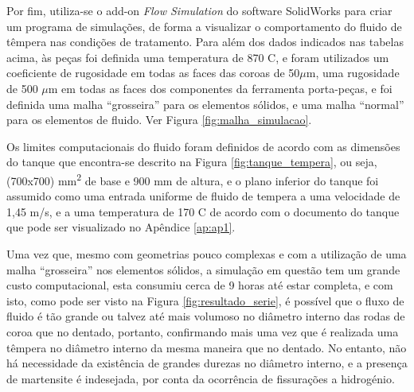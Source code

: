 \par
Por fim, utiliza-se o add-on \textit{Flow Simulation} do software SolidWorks para criar um programa de simulações, de forma a visualizar o comportamento do fluido de têmpera nas condições de tratamento. Para além dos dados indicados nas tabelas acima, às peças foi definida uma temperatura de 870 \textdegree C, e foram utilizados um coeficiente de rugosidade em todas as faces das coroas de 50$\mu$m, uma rugosidade de 500 $\mu$m em todas as faces dos componentes da ferramenta porta-peças, e foi definida uma malha “grosseira” para os elementos sólidos, e uma malha “normal” para os elementos de fluido. Ver Figura \ref{fig:malha_simulacao}.
\par
Os limites computacionais do fluido foram definidos de acordo com as dimensões do tanque que encontra-se descrito na Figura \ref{fig:tanque_tempera}, ou seja, (700x700) mm\textsuperscript{2} de base e 900 mm de altura, e o plano inferior do tanque foi assumido como uma entrada uniforme de fluido de tempera a uma velocidade de 1,45 m/s, e a uma temperatura de 170 \textdegree C de acordo com o documento do tanque que pode ser visualizado no Apêndice \ref{ap:ap1}.
\newpage
\par
Uma vez que, mesmo com geometrias pouco complexas e com a utilização de uma malha “grosseira” nos elementos sólidos, a simulação em questão tem um grande custo computacional, esta consumiu cerca de 9 horas até estar completa, e com isto, como pode ser visto na Figura \ref{fig:resultado_serie}, é possível  que o fluxo de fluido é tão grande ou talvez até mais volumoso no diâmetro interno das rodas de coroa que no dentado, portanto, confirmando mais uma vez que é realizada uma têmpera no diâmetro interno da mesma maneira que no dentado. No entanto, não há necessidade da existência de grandes durezas no diâmetro interno, e a presença de martensite é indesejada, por conta da ocorrência de fissurações a hidrogénio.
